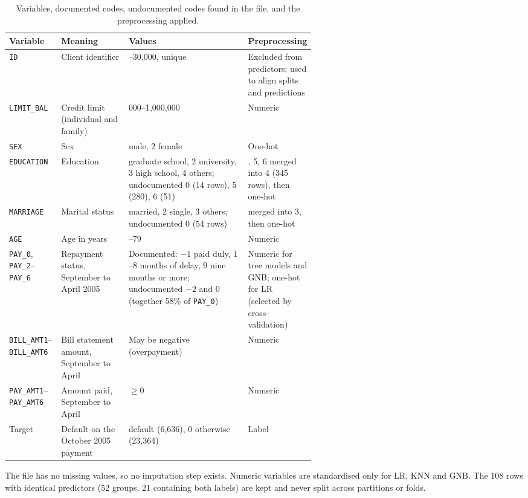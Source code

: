 \documentclass{article}
\begin{document}
\begin{table}[h]
  \caption{Variables, documented codes, undocumented codes found in the file, and the preprocessing applied.}
  \centering
  \small
  \begin{tabularx}{\linewidth}{@{}>{\raggedright\arraybackslash}p{0.17\linewidth}>{\raggedright\arraybackslash}p{0.22\linewidth}>{\raggedright\arraybackslash}X>{\raggedright\arraybackslash}p{0.2\linewidth}@{}}
    \toprule
    Variable & Meaning & Values & Preprocessing \\
    \midrule
    \texttt{ID} & Client identifier & 1--30{,}000, unique & Excluded from predictors; used to align splits and predictions \\
    \texttt{LIMIT\_BAL} & Credit limit (individual and family) & 10{,}000--1{,}000{,}000 & Numeric \\
    \texttt{SEX} & Sex & 1 male, 2 female & One-hot \\
    \texttt{EDUCATION} & Education & 1 graduate school, 2 university, 3 high school, 4 others; undocumented 0 (14 rows), 5 (280), 6 (51) & 0, 5, 6 merged into 4 (345 rows), then one-hot \\
    \texttt{MARRIAGE} & Marital status & 1 married, 2 single, 3 others; undocumented 0 (54 rows) & 0 merged into 3, then one-hot \\
    \texttt{AGE} & Age in years & 21--79 & Numeric \\
    \texttt{PAY\_0}, \texttt{PAY\_2}--\texttt{PAY\_6} & Repayment status, September to April 2005 & Documented: $-1$ paid duly, $1$--$8$ months of delay, $9$ nine months or more; undocumented $-2$ and $0$ (together 58\% of \texttt{PAY\_0}) & Numeric for tree models and GNB; one-hot for LR (selected by cross-validation) \\
    \texttt{BILL\_AMT1}--\texttt{BILL\_AMT6} & Bill statement amount, September to April & May be negative (overpayment) & Numeric \\
    \texttt{PAY\_AMT1}--\texttt{PAY\_AMT6} & Amount paid, September to April & $\ge 0$ & Numeric \\
    Target & Default on the October 2005 payment & 1 default (6{,}636), 0 otherwise (23{,}364) & Label \\
    \bottomrule
  \end{tabularx}
\end{table}

The file has no missing values, so no imputation step exists. Numeric variables are standardised only for LR, KNN and GNB. The 108 rows with identical predictors (52 groups, 21 containing both labels) are kept and never split across partitions or folds.
\end{document}

